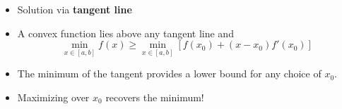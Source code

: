 \documentclass[11pt,twoside]{report}
\begin{document}
\begin{itemize}
\begin{itemize}
\item Solution via \textbf{tangent line} 
\item A convex function lies above any tangent line and 
  \[ \min_{x\in [a,b]} f(x) \geq \min_{x\in [a,b]} \left[ f(x_0)+(x-x_0) f'(x_0) \right] 
  \]
  
  \item The minimum of the tangent provides a lower bound for any choice of $x_0$. 
    \item Maximizing over $x_0$ recovers the minimum!
\end{itemize}
\end{itemize}



 
\end{document}

